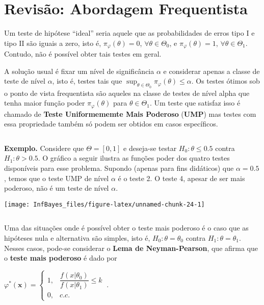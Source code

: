 \documentclass[
]{book}
\begin{document}
\(~\)

\hypertarget{revisuxe3o-abordagem-frequentista}{%
\section{Revisão: Abordagem Frequentista}\label{revisuxe3o-abordagem-frequentista}}

Um teste de hipótese ``ideal'' seria aquele que as probabilidades de erros tipo I e tipo II são iguais a zero, isto é, \(\pi_\varphi(\theta)=0\), \(\forall \theta \in \Theta_0\), e \(\pi_\varphi(\theta)=1\), \(\forall \theta \in \Theta_1\). Contudo, não é possível obter tais testes em geral.

A solução usual é fixar um nível de significância \(\alpha\) e considerar apenas a classe de teste de nível \(\alpha\), isto é, testes tais que \(\displaystyle\sup_{\theta\in\Theta_0}\pi_\varphi(\theta) \leq \alpha\). Os testes ótimos sob o ponto de vista frequentista são aqueles na classe de testes de nível alpha que tenha maior função poder \({\pi}_\varphi(\theta)\) para \(\theta \in \Theta_1\). Um teste que satisfaz isso é chamado de \textbf{Teste Uniformememte Mais Poderoso} (\textbf{UMP}) mas testes com essa propriedade também só podem ser obtidos em casos específicos.

\(~\)

\textbf{Exemplo.} Considere que \(\Theta=[0,1]\) e deseja-se testar \(H_0: \theta \leq 0.5\) contra \(H_1: \theta > 0.5\). O gráfico a seguir ilustra as funções poder dos quatro testes disponíveis para esse problema. Supondo (apenas para fins didáticos) que \(\alpha=0.5\), temos que o teste UMP de nível \(\alpha\) é o teste 2. O teste 4, apesar de ser mais poderoso, não é um teste de nível \(\alpha\).

\begin{center}\texttt{[image: InfBayes\_files/figure-latex/unnamed-chunk-24-1]} \end{center}

\(~\)

Uma das situações onde é possível obter o teste mais poderoso é o caso que as hipóteses nula e alternativa são simples, isto é, \(H_0:\theta=\theta_0\) contra \(H_1:\theta=\theta_1\). Nesses casos, pode-se considerar o \textbf{Lema de Neyman-Pearson}, que afirma que o \textbf{teste mais poderoso} é dado por

\({\varphi}^*(\boldsymbol x)=\left\{\begin{array}{rl} 1,& \dfrac{f(x|\theta_0)}{f(x|\theta_1)}\leq k\\ 0,& c.c.\end{array}\right.~.\)
\end{document}
